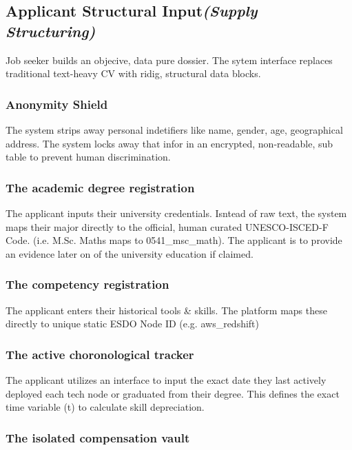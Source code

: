 \documentclass[a4paper, 12pt]{article}
\begin{document}
\subsection{Applicant Structural Input\textit{(Supply Structuring)}}

Job seeker builds an objecive, data pure dossier. The sytem interface replaces traditional text-heavy CV with ridig, structural data blocks.


\subsubsection{Anonymity Shield}

The system strips away personal indetifiers like name, gender, age, geographical address. The system locks away that infor in an encrypted, non-readable, sub table to prevent human discrimination.

\subsubsection{The academic degree registration}

The applicant inputs their university credentials. Isntead of raw text, the system maps their major directly to the official, human curated UNESCO-ISCED-F Code. (i.e. M.Sc. Maths maps to 0541\_msc\_math). The applicant is to provide an evidence later on of the university education if claimed.

\subsubsection{The competency registration}

The applicant enters their historical tools \& skills. The platform maps these directly to unique static ESDO Node ID (e.g. aws\_redshift)

\subsubsection{The active choronological tracker}

The applicant utilizes an interface to input the exact date they last actively deployed each tech node or graduated from their degree. This defines the exact time variable (t) to calculate skill depreciation.

\subsubsection{The isolated compensation vault}
\end{document}
